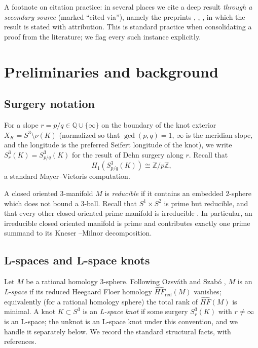 \documentclass[11pt]{amsart}
\theoremstyle{definition}
\theoremstyle{remark}
\numberwithin{equation}{section}
\begin{document}
A footnote on citation practice: in several places we cite a deep result
\emph{through a secondary source} (marked ``cited via''), namely the
preprints \cite{Howie}, \cite{GW}, \cite{ORS}, in which the result is
stated with attribution. This is standard practice when consolidating a
proof from the literature; we flag every such instance explicitly.

\section{Preliminaries and background}\label{sec:prelim}

\subsection{Surgery notation}
For a slope $r=p/q\in\mathbb{Q}\cup\{\infty\}$ on the boundary of the knot
exterior $X_{K}=S^{3}\setminus\nu(K)$ (normalized so that
$\gcd(p,q)=1$, $\infty$ is the meridian slope, and the longitude is the
preferred Seifert longitude of the knot), we write
$S^{3}_{r}(K)=S^{3}_{p/q}(K)$ for the result of Dehn surgery along $r$.
Recall that
\begin{equation}\label{eq:h1}
H_{1}(S^{3}_{p/q}(K))\cong \mathbb{Z}/p\mathbb{Z},
\end{equation}
a standard Mayer--Vietoris computation.

A closed oriented $3$-manifold $M$ is \emph{reducible} if it contains an
embedded $2$-sphere which does not bound a $3$-ball. Recall that
$S^{1}\times S^{2}$ is prime but reducible, and that every other closed
oriented prime manifold is irreducible
\cite[\S 3]{Hempel}. In particular, an irreducible closed oriented
manifold is prime and contributes exactly one prime summand to its Kneser
--Milnor decomposition.

\subsection{L-spaces and L-space knots}
Let $M$ be a rational homology $3$-sphere. Following
Ozsv\'ath and Szab\'o \cite{OS1}, $M$ is an \emph{L-space} if its
reduced Heegaard Floer homology $\widehat{HF}_{\mathrm{red}}(M)$
vanishes; equivalently (for a rational homology sphere) the total rank of
$\widehat{HF}(M)$ is minimal. A knot $K\subset S^{3}$ is an
\emph{L-space knot} if some surgery $S^{3}_{r}(K)$ with $r\neq\infty$ is
an L-space; the unknot is an L-space knot under this convention, and we
handle it separately below. We record the standard structural facts, with
references.
\end{document}
